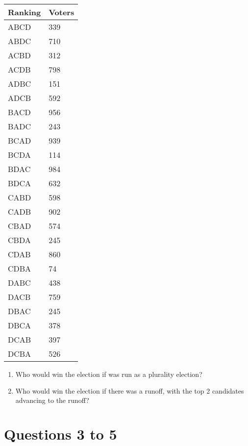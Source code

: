 \begin{table}[htbp]
\begin{minipage}{\linewidth}
\setlength{\tymax}{0.5\linewidth}
\centering
\small
\begin{tabulary}{\textwidth}{@{}ll@{}} \toprule
	Ranking	&	Voters	\\
\midrule

	ABCD	&	339	\\
	ABDC	&	710	\\
	ACBD	&	312	\\
	ACDB	&	798	\\
	ADBC	&	151	\\
	ADCB	&	592	\\
	BACD	&	956	\\
	BADC	&	243	\\
	BCAD	&	939	\\
	BCDA	&	114	\\
	BDAC	&	984	\\
	BDCA	&	632	\\
	CABD	&	598	\\
	CADB	&	902	\\
	CBAD	&	574	\\
	CBDA	&	245	\\
	CDAB	&	860	\\
	CDBA	&	74	\\
	DABC	&	438	\\
	DACB	&	759	\\
	DBAC	&	245	\\
	DBCA	&	378	\\
	DCAB	&	397	\\
	DCBA	&	526	\\
\bottomrule

\end{tabulary}
\end{minipage}
\end{table}

\begin{enumerate}
\item{} Who would win the election if was run as a plurality election?

\item{} Who would win the election if there was a runoff, with the top 2 candidates advancing to the runoff?

\end{enumerate}

\newpage

\section{Questions 3 to 5}
\label{questions3to5}

